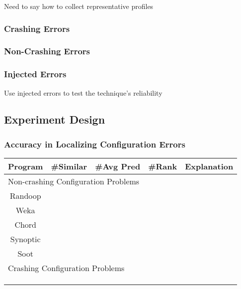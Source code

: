 Need to say how to collect representative profiles

\subsubsection{Crashing Errors}

\subsubsection{Non-Crashing Errors}

\subsubsection{Injected Errors}

Use injected errors to test the technique's reliability

\subsection{Experiment Design}



\subsubsection{Accuracy in Localizing Configuration Errors}

\begin{table}[t]
\setlength{\tabcolsep}{.84\tabcolsep}
\begin{tabular}{|c|c|c|c|c|}
\hline
 Program & \#Similar & \#Avg Pred & \#Rank & Explanation \\
 \hline
\hline
\multicolumn{5}{|l|}{Non-crashing Configuration Problems}   \\
 \hline
 Randoop & &  &&  \\
\hline
 Weka &  & & & \\
\hline
 Chord & & & &\\
\hline
 Synoptic & & && \\
\hline
 Soot &  &    &&\\
\hline
\hline
\multicolumn{5}{|l|}{Crashing Configuration Problems}   \\
\hline
& & & &\\
\hline
& & & &\\
\hline
& & & &\\
\hline
\end{tabular}

\end{table}

